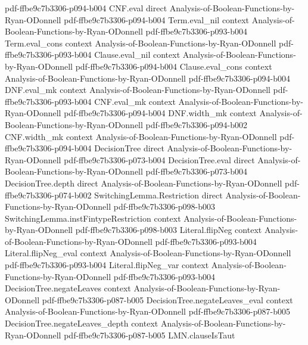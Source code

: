 \begin{lemma}
  {pdf-ffbe9c7b3306-p094-b004}
\proofstep
  {CNF.eval}
  {direct}
  {Analysis-of-Boolean-Functions-by-Ryan-ODonnell}
  {pdf-ffbe9c7b3306-p094-b004}
\proofstep
  {Term.eval_nil}
  {context}
  {Analysis-of-Boolean-Functions-by-Ryan-ODonnell}
  {pdf-ffbe9c7b3306-p093-b004}
\proofstep
  {Term.eval_cons}
  {context}
  {Analysis-of-Boolean-Functions-by-Ryan-ODonnell}
  {pdf-ffbe9c7b3306-p093-b004}
\proofstep
  {Clause.eval_nil}
  {context}
  {Analysis-of-Boolean-Functions-by-Ryan-ODonnell}
  {pdf-ffbe9c7b3306-p094-b004}
\proofstep
  {Clause.eval_cons}
  {context}
  {Analysis-of-Boolean-Functions-by-Ryan-ODonnell}
  {pdf-ffbe9c7b3306-p094-b004}
\proofstep
  {DNF.eval_mk}
  {context}
  {Analysis-of-Boolean-Functions-by-Ryan-ODonnell}
  {pdf-ffbe9c7b3306-p093-b004}
\proofstep
  {CNF.eval_mk}
  {context}
  {Analysis-of-Boolean-Functions-by-Ryan-ODonnell}
  {pdf-ffbe9c7b3306-p094-b004}
\proofstep
  {DNF.width_mk}
  {context}
  {Analysis-of-Boolean-Functions-by-Ryan-ODonnell}
  {pdf-ffbe9c7b3306-p094-b002}
\proofstep
  {CNF.width_mk}
  {context}
  {Analysis-of-Boolean-Functions-by-Ryan-ODonnell}
  {pdf-ffbe9c7b3306-p094-b004}
\proofstep
  {DecisionTree}
  {direct}
  {Analysis-of-Boolean-Functions-by-Ryan-ODonnell}
  {pdf-ffbe9c7b3306-p073-b004}
\proofstep
  {DecisionTree.eval}
  {direct}
  {Analysis-of-Boolean-Functions-by-Ryan-ODonnell}
  {pdf-ffbe9c7b3306-p073-b004}
\proofstep
  {DecisionTree.depth}
  {direct}
  {Analysis-of-Boolean-Functions-by-Ryan-ODonnell}
  {pdf-ffbe9c7b3306-p074-b002}
\proofstep
  {SwitchingLemma.Restriction}
  {direct}
  {Analysis-of-Boolean-Functions-by-Ryan-ODonnell}
  {pdf-ffbe9c7b3306-p098-b003}
\proofstep
  {SwitchingLemma.instFintypeRestriction}
  {context}
  {Analysis-of-Boolean-Functions-by-Ryan-ODonnell}
  {pdf-ffbe9c7b3306-p098-b003}
\proofstep
  {Literal.flipNeg}
  {context}
  {Analysis-of-Boolean-Functions-by-Ryan-ODonnell}
  {pdf-ffbe9c7b3306-p093-b004}
\proofstep
  {Literal.flipNeg_eval}
  {context}
  {Analysis-of-Boolean-Functions-by-Ryan-ODonnell}
  {pdf-ffbe9c7b3306-p093-b004}
\proofstep
  {Literal.flipNeg_var}
  {context}
  {Analysis-of-Boolean-Functions-by-Ryan-ODonnell}
  {pdf-ffbe9c7b3306-p093-b004}
\proofstep
  {DecisionTree.negateLeaves}
  {context}
  {Analysis-of-Boolean-Functions-by-Ryan-ODonnell}
  {pdf-ffbe9c7b3306-p087-b005}
\proofstep
  {DecisionTree.negateLeaves_eval}
  {context}
  {Analysis-of-Boolean-Functions-by-Ryan-ODonnell}
  {pdf-ffbe9c7b3306-p087-b005}
\proofstep
  {DecisionTree.negateLeaves_depth}
  {context}
  {Analysis-of-Boolean-Functions-by-Ryan-ODonnell}
  {pdf-ffbe9c7b3306-p087-b005}
\proofstep
  {LMN.clauseIsTaut}

\end{lemma}
